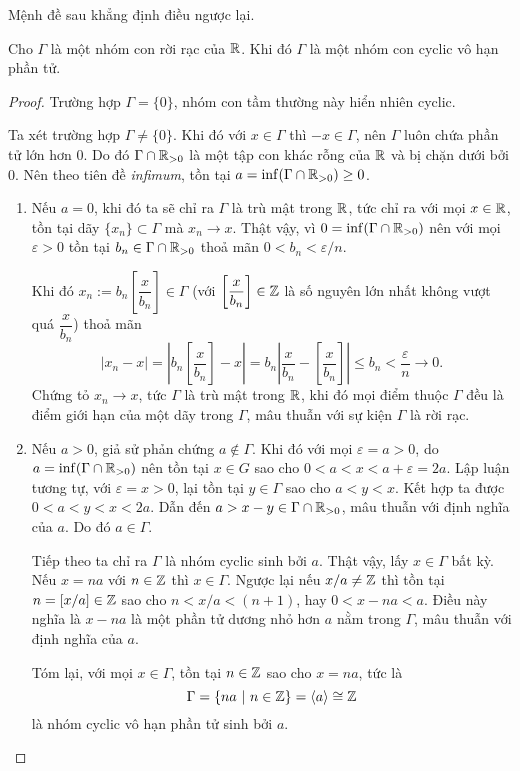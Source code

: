     Mệnh đề sau khẳng định điều ngược lại.
\begin{prop}\label{prop 3.2.3}
    Cho $\Gamma$ là một nhóm con rời rạc của $\mathbb{R}$. Khi đó $\Gamma$ là một nhóm con cyclic vô hạn phần tử.
\end{prop}
\begin{proof}
    Trường hợp $\Gamma = \{0\}$, nhóm con tầm thường này hiển nhiên cyclic.

    Ta xét trường hợp $\Gamma \neq \{0\}$. 
    Khi đó với $x \in \Gamma$ thì $-x \in \Gamma$, nên $\Gamma$ luôn chứa phần tử lớn hơn $0$. Do đó $\Gamma \cap \mathbb{R}_{>0}$ là một tập con khác rỗng của $\mathbb{R}$ và bị chặn dưới bởi $0$. Nên theo tiên đề \textit{infimum}, tồn tại $a = \inf (\Gamma \cap \mathbb{R}_{>0}) \geq 0$. 

    \begin{enumerate}
        \item Nếu $a = 0$, khi đó ta sẽ chỉ ra $\Gamma$ là trù mật trong $\mathbb{R}$, tức chỉ ra với mọi $x \in \mathbb{R}$, tồn tại dãy $\{x_n\} \subset \Gamma$ mà $x_n \to x$. Thật vậy, vì $0 = \inf (\Gamma \cap \mathbb{R}_{>0})$ nên với mọi $\varepsilon >0$ tồn tại $b_n \in \Gamma \cap \mathbb{R}_{>0}$ thoả mãn $0 < b_n <\varepsilon/n$.
        
        Khi đó $x_n := b_n \left[\dfrac{x}{b_n}\right] \in \Gamma$ (với $\left[\dfrac{x}{b_n}\right] \in \mathbb{Z}$ là số nguyên lớn nhất không vượt quá  $\dfrac{x}{b_n}$) thoả mãn
        \[|x_n - x| = \left|b_n \left[\dfrac{x}{b_n}\right] - x\right| = b_n\left|\dfrac{x}{b_n} - \left[\dfrac{x}{b_n}\right]\right|\leq b_n < \dfrac{\varepsilon}{n} \to 0.\]
        Chứng tỏ $x_n \to x$, tức $\Gamma$ là trù mật trong $\mathbb{R}$, khi đó  mọi điểm thuộc $\Gamma$ đều là điểm giới hạn của một dãy trong $\Gamma$, mâu thuẫn với sự kiện $\Gamma$ là rời rạc.

        \item Nếu $a>0$, giả sử phản chứng $a \notin \Gamma$. Khi đó với mọi $\varepsilon  = a > 0$, do $a = \inf (\Gamma \cap \mathbb{R}_{>0})$ nên tồn tại $x \in G$ sao cho $0 < a < x < a+ \varepsilon = 2a $. Lập luận tương tự, với $\varepsilon = x > 0$, lại tồn tại $y \in \Gamma$ sao cho $a<y<x$. Kết hợp ta được $0<a<y<x<2a$. Dẫn đến $a>x-y \in \Gamma \cap \mathbb{R}_{>0}$, mâu thuẫn với định nghĩa của $a$. Do đó $a \in \Gamma$. 
        
        Tiếp theo ta chỉ ra $\Gamma$ là nhóm cyclic sinh bởi $a$. Thật vậy, lấy $x \in \Gamma$ bất kỳ. Nếu $x = na$ với $n \in \mathbb{Z}$ thì $x \in \Gamma$. Ngược lại nếu $x/a \neq \mathbb{Z}$ thì tồn tại $n  = [x/a]\in \mathbb{Z}$ sao cho $n < x/a <(n+1)$, hay $0<x-na<a$. Điều này nghĩa là $x-na$ là một phần tử dương nhỏ hơn $a$ nằm trong $\Gamma$, mâu thuẫn với định nghĩa của $a$. 

        Tóm lại, với mọi $x \in \Gamma$, tồn tại $n \in \mathbb{Z}$ sao cho $x = na$, tức là 
        \[\Gamma = \{na~|~n \in \mathbb{Z}\} = \left<a\right>\cong \mathbb{Z}\] là nhóm cyclic vô hạn phần tử sinh bởi $a$.
    \end{enumerate}
\end{proof}
